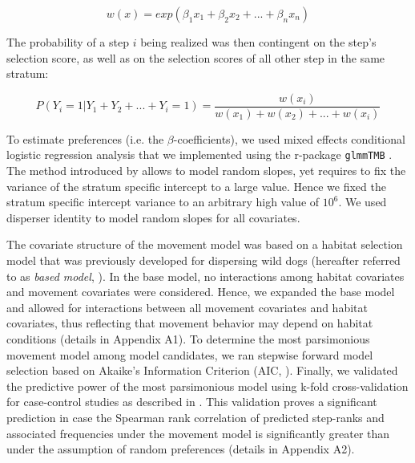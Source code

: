 \documentclass[abstract=on,10pt,a4paper,bibliography=totocnumbered]{article}
\begin{document}
\begin{equation}
\label{EQ1}
  w(x) = exp(\beta_1 x_1 + \beta_2 x_2 + ... + \beta_n x_n)
\end{equation}

\noindent The probability of a step \(i\) being realized was then contingent on
the step's selection score, as well as on the selection scores of all other step
in the same stratum:

\begin{equation}
\label{EQ2}
  P(Y_{i} = 1 | Y_{1} + Y_{2} + ... + Y_{i} = 1) =
  \frac{w(x_{i})}{w(x_{1}) + w(x_{2}) + ... + w(x_{i})}
\end{equation}

\noindent To estimate preferences (i.e. the \(\beta\)-coefficients), we used
mixed effects conditional logistic regression analysis \citep{Muff.2020} that we
implemented using the r-package {\tt glmmTMB} \citep{Brooks.2017}. The method
introduced by \cite{Muff.2020} allows to model random slopes, yet requires to
fix the variance of the stratum specific intercept to a large value. Hence we
fixed the stratum specific intercept variance to an arbitrary high value of \(10
^ 6\). We used disperser identity to model random slopes for all covariates.

The covariate structure of the movement model was based on a habitat selection
model that was previously developed for dispersing wild dogs (hereafter referred
to as \textit{based model}, \citealp{Hofmann.2021}). In the base model, no
interactions among habitat covariates and movement covariates were considered.
Hence, we expanded the base model and allowed for interactions between all
movement covariates and habitat covariates, thus reflecting that movement
behavior may depend on habitat conditions (details in Appendix A1). To determine
the most parsimonious movement model among model candidates, we ran stepwise
forward model selection based on Akaike's Information Criterion (AIC,
\citealp{Burnham.2002}). Finally, we validated the predictive power of the most
parsimonious model using k-fold cross-validation for case-control studies as
described in \cite{Fortin.2009}. This validation proves a significant prediction
in case the Spearman rank correlation of predicted step-ranks and associated
frequencies under the movement model is significantly greater than under the
assumption of random preferences (details in Appendix A2).
\end{document}
